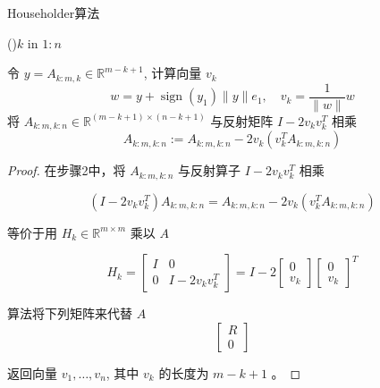 \begin{center}
\end{center}


\begin{algorithm}[htbp]
    \caption{Householder算法}

    \For(){$k$ in $1:n$}{
        令 $ y=A_{k: m, k} \in \mathbb{R}^{m-k+1} $, 计算向量 $ v_{k} $
    $$ w=y+\operatorname{sign}\left(y_{1}\right)\|y\| e_{1}, \quad v_{k}=\frac{1}{\|w\|} w $$\;
    将 $ A_{k: m, k: n} \in \mathbb{R}^{(m-k+1) \times(n-k+1)} $ 与反射矩阵 $ I-2 v_{k} v_{k}^{T} $ 相乘
    $$ A_{k: m, k: n}:=A_{k: m, k: n}-2 v_{k}\left(v_{k}^{T} A_{k: m, k: n}\right) $$\;

    }
    
\end{algorithm}

\begin{proof}
    在步骤2中，将 $ A_{k: m, k: n} $ 与反射算子 $ I-2 v_{k} v_{k}^{T} $ 相乘

$$ \left(I-2 v_{k} v_{k}^{T}\right) A_{k: m, k: n}=A_{k: m, k: n}-2 v_{k}\left(v_{k}^{T} A_{k: m, k: n}\right) $$

等价于用 $ H_{k} \in \mathbb{R}^{m \times m} $ 乘以 $ A $

$$ H_{k}=\left[\begin{array}{cc}I & 0 \\ 0 & I-2 v_{k} v_{k}^{T}\end{array}\right]=I-2\left[\begin{array}{c}0 \\ v_{k}\end{array}\right]\left[\begin{array}{l}0 \\ v_{k}\end{array}\right]^{T} $$

算法将下列矩阵来代替 $ A $
$$
\left[\begin{array}{c}
R \\
0
\end{array}\right]
$$

返回向量 $ v_{1}, \ldots, v_{n} $, 其中 $ v_{k} $ 的长度为 $ m-k+1 $ 。
\end{proof}


